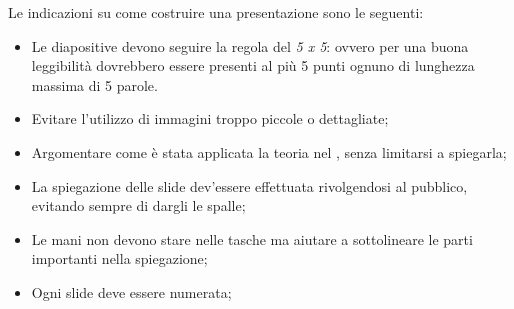 \label{itm:presentazione}
Le indicazioni su come costruire una presentazione sono le seguenti:
\begin{itemize}

\item Le diapositive devono seguire la regola del \textit{5 x 5}: ovvero per una buona leggibilit\`a dovrebbero essere presenti al pi\`u 5 punti ognuno di lunghezza massima di 5 parole.

\item Evitare l'utilizzo di immagini troppo piccole o dettagliate;

\item Argomentare come \`e stata applicata la teoria nel , senza limitarsi a spiegarla;

\item La spiegazione delle slide dev'essere effettuata rivolgendosi al pubblico, evitando sempre di dargli le spalle;

\item Le mani non devono stare nelle tasche ma aiutare a sottolineare le parti importanti nella spiegazione;

\item Ogni slide deve essere numerata;

\end{itemize}
